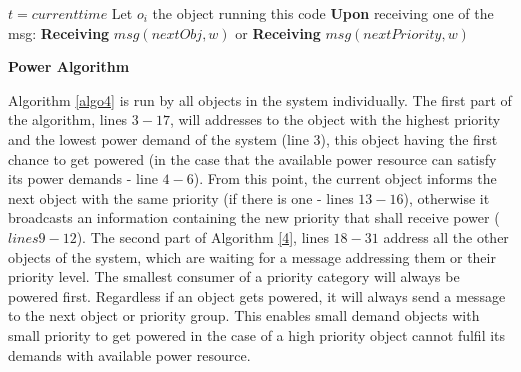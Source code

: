 \documentclass[../main/Self-Stabilization.tex]{subfiles}
\begin{document}
\LinesNumbered
\IncMargin{1em}
\begin{algorithm}
$t = current time$
\BlankLine
Let $o_{i}$ the object running this code
\BlankLine
{}
\textbf{Upon} receiving one of the msg:\newline
\textbf{Receiving} $msg(nextObj, w)$ or\newline
\textbf{Receiving} $msg(nextPriority, w)$\newline
{}
\caption{\textbf{Power Algorithm}} \label{algo4}
\end{algorithm}
\DecMargin{1em}

Algorithm \ref{algo4} is run by all objects in the system individually. The first part of the algorithm, lines $3-17$, will addresses to the object with the highest priority and the lowest power demand of the system (line $3$), this object having the first chance to get powered (in the case that the available power resource can satisfy its power demands - line $4-6$). From this point, the current object informs the next object with the same priority (if there is one - lines $13-16$), otherwise it broadcasts an information containing the new priority that shall receive power ($lines 9-12$). The second part of Algorithm \ref{4}, lines $18-31$ address all the other objects of the system, which are waiting for a message addressing them or their priority level. The smallest consumer of a priority category will always be powered first. Regardless if an object gets powered, it will always send a message to the next object or priority group. This enables small demand objects with small priority to get powered in the case of a high priority object cannot fulfil its demands with available power resource.
\end{document}
